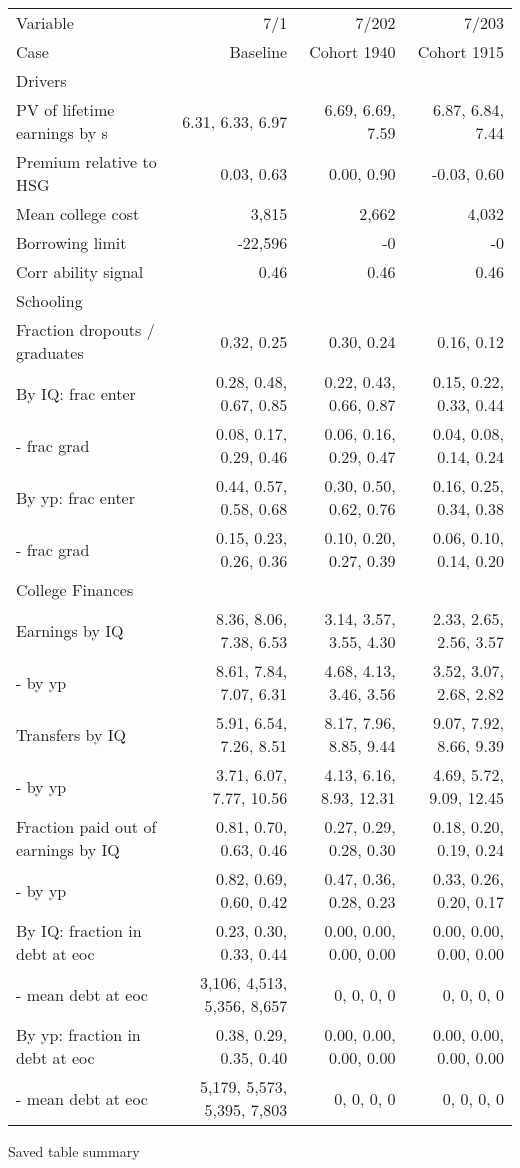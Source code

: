 \begin{tabular}{lrrr}
\hline
Variable & 7/1  & 7/202  & 7/203  \\
Case & Baseline  & Cohort 1940  & Cohort 1915  \\
Drivers &   &   &   \\
PV of lifetime earnings by s & 6.31, 6.33, 6.97  & 6.69, 6.69, 7.59  & 6.87, 6.84, 7.44  \\
Premium relative to HSG & 0.03, 0.63  & 0.00, 0.90  & -0.03, 0.60  \\
Mean college cost & 3,815  & 2,662  & 4,032  \\
Borrowing limit & -22,596  & -0  & -0  \\
Corr ability signal & 0.46  & 0.46  & 0.46  \\
\hline
Schooling &   &   &   \\
Fraction dropouts / graduates & 0.32, 0.25  & 0.30, 0.24  & 0.16, 0.12  \\
By IQ: frac enter & 0.28, 0.48, 0.67, 0.85  & 0.22, 0.43, 0.66, 0.87  & 0.15, 0.22, 0.33, 0.44  \\
- frac grad & 0.08, 0.17, 0.29, 0.46  & 0.06, 0.16, 0.29, 0.47  & 0.04, 0.08, 0.14, 0.24  \\
By yp: frac enter & 0.44, 0.57, 0.58, 0.68  & 0.30, 0.50, 0.62, 0.76  & 0.16, 0.25, 0.34, 0.38  \\
- frac grad & 0.15, 0.23, 0.26, 0.36  & 0.10, 0.20, 0.27, 0.39  & 0.06, 0.10, 0.14, 0.20  \\
\hline
College Finances &   &   &   \\
Earnings by IQ & 8.36, 8.06, 7.38, 6.53  & 3.14, 3.57, 3.55, 4.30  & 2.33, 2.65, 2.56, 3.57  \\
- by yp & 8.61, 7.84, 7.07, 6.31  & 4.68, 4.13, 3.46, 3.56  & 3.52, 3.07, 2.68, 2.82  \\
Transfers by IQ & 5.91, 6.54, 7.26, 8.51  & 8.17, 7.96, 8.85, 9.44  & 9.07, 7.92, 8.66, 9.39  \\
- by yp & 3.71, 6.07, 7.77, 10.56  & 4.13, 6.16, 8.93, 12.31  & 4.69, 5.72, 9.09, 12.45  \\
Fraction paid out of earnings by IQ & 0.81, 0.70, 0.63, 0.46  & 0.27, 0.29, 0.28, 0.30  & 0.18, 0.20, 0.19, 0.24  \\
- by yp & 0.82, 0.69, 0.60, 0.42  & 0.47, 0.36, 0.28, 0.23  & 0.33, 0.26, 0.20, 0.17  \\
By IQ: fraction in debt at eoc & 0.23, 0.30, 0.33, 0.44  & 0.00, 0.00, 0.00, 0.00  & 0.00, 0.00, 0.00, 0.00  \\
- mean debt at eoc & 3,106, 4,513, 5,356, 8,657  & 0, 0, 0, 0  & 0, 0, 0, 0  \\
By yp: fraction in debt at eoc & 0.38, 0.29, 0.35, 0.40  & 0.00, 0.00, 0.00, 0.00  & 0.00, 0.00, 0.00, 0.00  \\
- mean debt at eoc & 5,179, 5,573, 5,395, 7,803  & 0, 0, 0, 0  & 0, 0, 0, 0  \\
\hline
\end{tabular}%
Saved table summary

